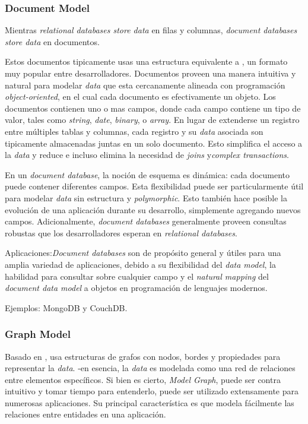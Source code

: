 \subsubsection*{Document Model}\label{cap:estadoArte:tecnologias:nosql:document_model}
 Mientras \textit{relational databases store data} en filas y columnas, \textit{document databases store data} en documentos.  

Estos documentos tipicamente usas una estructura equivalente a , un formato muy popular entre desarrolladores. Documentos proveen una manera intuitiva y natural para modelar \textit{data} que esta cercanamente alineada con  programación \textit{object-oriented}, en el cual cada documento es efectivamente un objeto. Los documentos contienen uno o mas campos, donde cada campo contiene un tipo de valor, tales como \textit{string}, \textit{date}, \textit{binary}, o \textit{array}. En lugar de extenderse un registro entre múltiples tablas y columnas, cada registro y su \textit{data} asociada son tipicamente almacenadas juntas en un solo documento. Esto simplifica el acceso a la \textit{data} y reduce e incluso elimina la necesidad de \textit{joins} y\textit{complex transactions}.

En un \textit{document database}, la noción de esquema es dinámica: cada documento puede contener diferentes campos. Esta flexibilidad puede ser particularmente útil para modelar \textit{data} sin estructura y \textit{polymorphic}. Esto también hace posible la evolución de una aplicación durante su desarrollo, simplemente agregando nuevos campos. Adicionalmente, \textit{document databases} generalmente proveen consultas robustas que los desarrolladores esperan en \textit{relational databases}.

Aplicaciones:\textit{Document databases} son de propósito general y útiles para una amplia variedad de aplicaciones, debido a su flexibilidad del \textit{data model}, la habilidad para consultar sobre cualquier campo y el \textit{natural mapping} del \textit{document data model} a objetos en programación de lenguajes modernos.

Ejemplos: MongoDB y CouchDB.

\subsubsection*{Graph Model}

Basado en , usa estructuras de grafos con nodos, bordes y propiedades para representar la \textit{data}. -en esencia, la \textit{data} es modelada como una red de relaciones entre elementos específicos. Si bien es cierto, \textit{Model Graph}, puede ser contra intuitivo y tomar tiempo para entenderlo, puede ser utilizado extensamente para numerosas aplicaciones. Su principal característica es que modela fácilmente las relaciones entre entidades en una aplicación.

